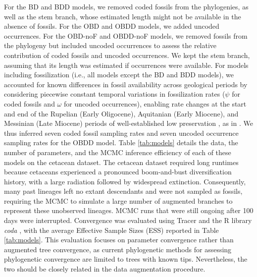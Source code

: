 \documentclass[oupdraft]{sysbio}
\newcommand{\revised}[1]{{\color{blue} #1}}
\begin{document}
For the BD and BDD models, we removed \revised{coded} fossils from the phylogenies, as well as the stem branch, \revised{whose estimated length might not be available in the absence of fossils}. For the OBD and OBDD models, we added \revised{uncoded} occurrences. For the OBD-noF and OBDD-noF models, we removed fossils from the phylogeny but included \revised{uncoded} occurrences to assess the relative contribution of \revised{coded} fossils \revised{and uncoded occurrences}. We kept the stem branch, \revised{assuming that its length was estimated if occurrences were available}.
For models including fossilization (i.e., all models except the BD and BDD models), we accounted for known differences in fossil availability across geological periods by considering piecewise constant temporal variations in fossilization rates ($\psi$ for \revised{coded} fossils and $\omega$ for \revised{uncoded} occurrences), enabling rate changes at the start and end of the \revised{Rupelian (Early Oligocene), Aquitanian (Early Miocene), and Messinian (Late Miocene)} periods of well-established low preservation \citep{marx_cetacean_2016, dominici_awkward_2020}, as in \citet{andreoletti_occurrence_2022}. We thus inferred seven \revised{coded} fossil sampling rates and seven \revised{uncoded} occurrence sampling rates for the OBDD model.
Table \ref{tab:models} details the data, the number of parameters, and the MCMC inference efficiency of each of these models on the cetacean dataset. \revised{The cetacean dataset required long runtimes because cetaceans experienced a pronounced boom-and-bust diversification history, with a large radiation followed by widespread extinction. Consequently, many past lineages left no extant descendants and were not sampled as fossils, requiring the MCMC to simulate a large number of augmented branches to represent these unobserved lineages.} MCMC runs that were still ongoing after 100 days were interrupted. Convergence was evaluated using Tracer \citep{rambaut_posterior_2018} and the R library \textit{coda} \citep{plummer_coda_2006}, with the average Effective Sample Sizes (ESS) reported in Table \ref{tab:models}. This evaluation focuses on parameter convergence rather than augmented tree convergence, as current phylogenetic methods for assessing phylogenetic convergence are limited to trees with known tips. Nevertheless, the two should be closely related in the data augmentation procedure.
\end{document}

